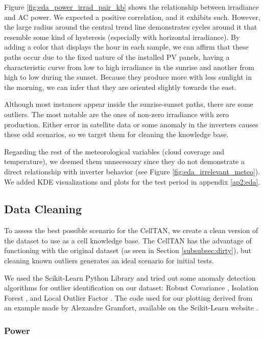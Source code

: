 Figure \ref{fig:eda_power_irrad_pair_kb} shows the relationship between irradiance and AC power. We expected a positive correlation, and it exhibits such. However, the large radius around the central trend line demonstrates cycles around it that resemble some kind of hysteresis (especially with horizontal irradiance). By adding a color that displays the hour in each sample, we can affirm that these paths occur due to the fixed nature of the installed PV panels, having a characteristic curve from low to high irradiance in the sunrise and another from high to low during the sunset. Because they produce more with less sunlight in the morning, we can infer that they are oriented slightly towards the east.

Although most instances appear inside the sunrise-sunset paths, there are some outliers. The most notable are the ones of non-zero irradiance with zero production. Either error in satellite data or some anomaly in the inverters causes these odd scenarios, so we target them for cleaning the knowledge base.

Regarding the rest of the meteorological variables (cloud coverage and temperature), we deemed them unnecessary since they do not demonstrate a direct relationship with inverter behavior (see Figure \ref{fig:eda_irrelevant_meteo}). We added KDE visualizations and plots for the test period in appendix \ref{ap2:eda}.

\subsection{Data Cleaning}

To assess the best possible scenario for the CellTAN, we create a clean version of the dataset to use as a cell knowledge base. The CellTAN has the advantage of functioning with the original dataset (as seen in Section \ref{subsubsec:dirty}), but cleaning known outliers generates an ideal scenario for initial tests.

We used the Scikit-Learn Python Library and tried out some anomaly detection algorithms for outlier identification on our dataset: Robust Covariance \cite{Rousseeuw1999}, Isolation Forest \cite{Liu2008} \cite{Liu2012}, and Local Outlier Factor \cite{Breunig2000}. The code used for our plotting derived from an example made by Alexandre Gramfort, available on the Scikit-Learn website \cite{sklearn_example}.

\subsubsection{Power}

